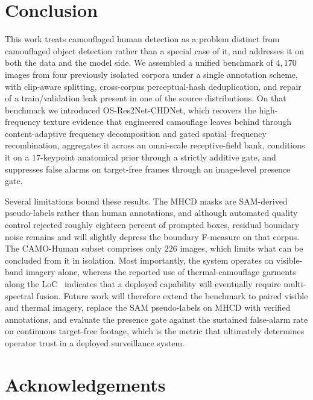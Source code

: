 \documentclass[3p,times,procedia]{elsarticle}
\begin{document}
\section{Conclusion}
\label{sec:conclusion}

This work treats camouflaged human detection as a problem distinct from camouflaged object detection rather than a special case of it, and addresses it on both the data and the model side. We assembled a unified benchmark of $4{,}170$ images from four previously isolated corpora under a single annotation scheme, with clip-aware splitting, cross-corpus perceptual-hash deduplication, and repair of a train/validation leak present in one of the source distributions. On that benchmark we introduced OS-Res2Net-CHDNet, which recovers the high-frequency texture evidence that engineered camouflage leaves behind through content-adaptive frequency decomposition and gated spatial--frequency recombination, aggregates it across an omni-scale receptive-field bank, conditions it on a $17$-keypoint anatomical prior through a strictly additive gate, and suppresses false alarms on target-free frames through an image-level presence gate.

Several limitations bound these results. The MHCD masks are SAM-derived pseudo-labels rather than human annotations, and although automated quality control rejected roughly eighteen percent of prompted boxes, residual boundary noise remains and will slightly depress the boundary F-measure on that corpus. The CAMO-Human subset comprises only $226$ images, which limits what can be concluded from it in isolation. Most importantly, the system operates on visible-band imagery alone, whereas the reported use of thermal-camouflage garments along the LoC~\cite{tribune2018} indicates that a deployed capability will eventually require multi-spectral fusion. Future work will therefore extend the benchmark to paired visible and thermal imagery, replace the SAM pseudo-labels on MHCD with verified annotations, and evaluate the presence gate against the sustained false-alarm rate on continuous target-free footage, which is the metric that ultimately determines operator trust in a deployed surveillance system.

\section*{Acknowledgements}

\end{document}
